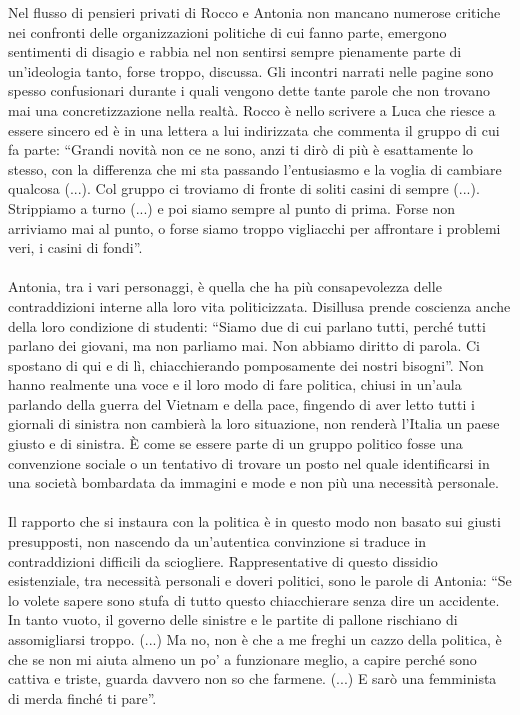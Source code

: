 Nel flusso di pensieri privati di Rocco e Antonia non mancano numerose critiche nei confronti delle organizzazioni politiche di cui fanno parte, emergono sentimenti di disagio e rabbia nel non sentirsi sempre pienamente parte di un'ideologia tanto, forse troppo, discussa.
Gli incontri narrati nelle pagine sono spesso confusionari durante i quali vengono dette tante parole che non trovano mai una concretizzazione nella realtà.
Rocco è nello scrivere a Luca che riesce a essere sincero ed è in una lettera a lui indirizzata che commenta il gruppo di cui fa parte: \enquote{Grandi novità non ce ne sono, anzi ti dirò di più è esattamente lo stesso, con la differenza che mi sta passando l'entusiasmo e la voglia di cambiare qualcosa (...). Col gruppo ci troviamo di fronte di soliti casini di sempre (...). Strippiamo a turno (...) e poi siamo sempre al punto di prima. Forse non arriviamo mai al punto, o forse siamo troppo vigliacchi per affrontare i problemi veri, i casini di fondi}.


\paragraph{}Antonia, tra i vari personaggi, è quella che ha più consapevolezza delle contraddizioni interne alla loro vita politicizzata.
Disillusa prende coscienza anche della loro condizione di studenti: \enquote{Siamo due di cui parlano tutti, perché tutti parlano dei giovani, ma non parliamo mai. Non abbiamo diritto di parola. Ci spostano di qui e di lì, chiacchierando pomposamente dei nostri bisogni}.
Non hanno realmente una voce e il loro modo di fare politica, chiusi in un'aula parlando della guerra del Vietnam e della pace, fingendo di aver letto tutti i giornali di sinistra non cambierà la loro situazione, non renderà l'Italia un paese giusto e di sinistra.
È come se essere parte di un gruppo politico fosse una convenzione sociale o un tentativo di trovare un posto nel quale identificarsi in una società bombardata da immagini e mode e non più una necessità personale.

\paragraph{}Il rapporto che si instaura con la politica è in questo modo non basato sui giusti presupposti, non nascendo da un'autentica convinzione si traduce in contraddizioni difficili da sciogliere.
Rappresentative di questo dissidio esistenziale, tra necessità personali e doveri politici, sono le parole di Antonia: \enquote{Se lo volete sapere sono stufa di tutto questo chiacchierare senza dire un accidente. In tanto vuoto, il governo delle sinistre e le partite di pallone rischiano di assomigliarsi troppo. (...) Ma no, non è che a me freghi un cazzo della politica, è che se non mi aiuta almeno un po' a funzionare meglio, a capire perché sono cattiva e triste, guarda davvero non so che farmene. (...) E sarò una femminista di merda finché ti pare}.

